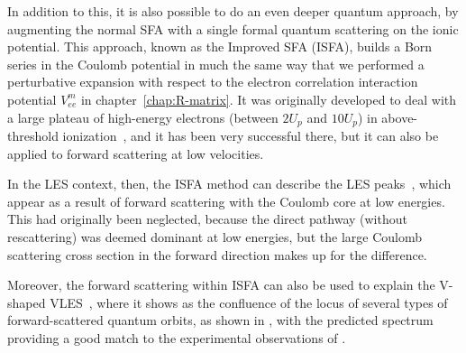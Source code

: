 In addition to this, it is also possible to do an even deeper quantum approach, by augmenting the normal SFA with a single formal quantum scattering on the ionic potential. This approach, known as the Improved SFA (ISFA), builds a Born series in the Coulomb potential in much the same way that we performed a perturbative expansion with respect to the electron correlation interaction potential $V_{ee}^m$ in chapter~\ref{chap:R-matrix}. It was originally developed to deal with a large plateau of high-energy electrons (between $2U_p$ and $10U_p$) in above-threshold ionization~\cite{goreslavskii_ISFA-standard_1998, milosevic_ISFA-standard_2007}, and it has been very successful there, but it can also be applied to forward scattering at low velocities.

In the LES context, then, the ISFA method can describe the LES peaks~\cite{ Becker_rescattering, Becker_Milosevic_quantum_orbits, Milosevic_scattering_large, Milosevic_reexamination, becker_milosevic_unified_2016}, which appear as a result of forward scattering with the Coulomb core at low energies. This had originally been neglected, because the direct pathway (without rescattering) was deemed dominant at low energies, but the large Coulomb scattering cross section in the forward direction makes up for the difference. 

Moreover, the forward scattering within ISFA can also be used to explain the V-shaped VLES~\cite{Becker_Milosevic_quantum_orbits, becker_ATI-low-energy_2015}, where it shows as the confluence of the locus of several types of forward-scattered quantum orbits, as shown in , with the predicted spectrum providing a good match to the experimental observations of .


